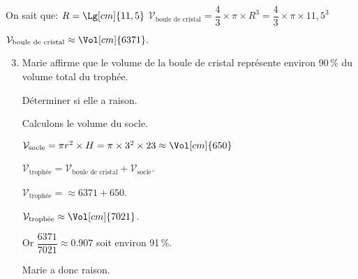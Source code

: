 \begin{corrige}
\begin{enumerate}
        {\color{red}On sait que: $R = \Lg[cm]{11,5}$        
            $\mathcal{V}_{\text{boule de cristal}} = \dfrac{4}{3} \times  \pi \times  R^3 =  \dfrac{4}{3} \times  \pi \times   11,5^3 $
            
            $\mathcal{V}_{\text{boule de cristal}} \approx \Vol[cm]{6371}.$
        }
    \end{enumerate}
    \Coupe
    \begin{enumerate}
        \setcounter{enumi}{2}
        \item Marie affirme que le volume de la boule de cristal représente environ 90\,\% du volume total du trophée.

        Déterminer si elle a raison.

        {\color{red}Calculons le volume du socle.
            
            $\mathcal{V}_{\text{socle}} = \pi r^2 \times H = \pi \times 3^2 \times 23 \approx \Vol[cm]{650}$
            
            $\mathcal{V}_{\text{trophée}}= \mathcal{V}_{\text{boule de cristal}} + \mathcal{V}_{\text{socle}}$.

            $\mathcal{V}_{\text{trophée}}=\approx \num{6371} + 650$.

            $\mathcal{V}_{\text{trophée}}\approx \Vol[cm]{7021}$.
            
            Or $\dfrac{\num{6371}}{\num{7021}}\approx  \num{0,907}$ soit environ 91\,\%.
            
            Marie a donc raison.
        }
    \end{enumerate}
\end{corrige}
